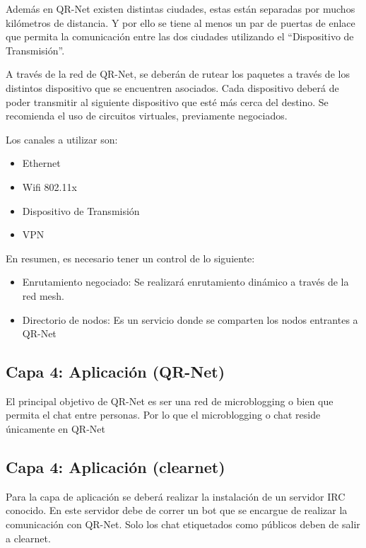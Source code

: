 \documentclass[11pt,a4paper]{scrartcl}			%
\providecommand{\tightlist}{%
          \setlength{\itemsep}{0pt}\setlength{\parskip}{0pt}}
\begin{document}
\begin{multicols*}{2}
Además en QR-Net existen distintas ciudades, estas están separadas por
muchos kilómetros de distancia. Y por ello se tiene al menos un par de
puertas de enlace que permita la comunicación entre las dos ciudades
utilizando el ``Dispositivo de Transmisión''.

A través de la red de QR-Net, se deberán de rutear los paquetes a través
de los distintos dispositivo que se encuentren asociados. Cada
dispositivo deberá de poder transmitir al siguiente dispositivo que esté
más cerca del destino. Se recomienda el uso de circuitos virtuales,
previamente negociados.

Los canales a utilizar son:

\begin{itemize}
\tightlist
\item
  Ethernet
\item
  Wifi 802.11x
\item
  Dispositivo de Transmisión
\item
  VPN
\end{itemize}

En resumen, es necesario tener un control de lo siguiente:

\begin{itemize}
\tightlist
\item
  Enrutamiento negociado: Se realizará enrutamiento dinámico a través de
  la red mesh.
\item
  Directorio de nodos: Es un servicio donde se comparten los nodos
  entrantes a QR-Net
\end{itemize}

\subsection{Capa 4: Aplicación
(QR-Net)}\label{capa-4-aplicaciuxf3n-qr-net}

El principal objetivo de QR-Net es ser una red de microblogging o bien
que permita el chat entre personas. Por lo que el microblogging o chat
reside únicamente en QR-Net

\subsection{Capa 4: Aplicación
(clearnet)}\label{capa-4-aplicaciuxf3n-clearnet}

Para la capa de aplicación se deberá realizar la instalación de un
servidor IRC conocido. En este servidor debe de correr un bot que se
encargue de realizar la comunicación con QR-Net. Solo los chat
etiquetados como públicos deben de salir a clearnet.


\end{multicols*}
\end{document}
